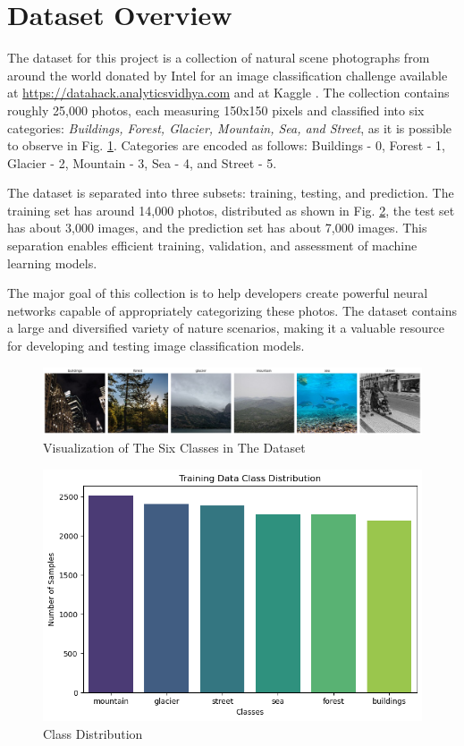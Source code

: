 \documentclass[conference]{IEEEtran}
\begin{document}
\section{Dataset Overview}
The dataset for this project is a collection of natural scene photographs from around the world donated by Intel for an image classification challenge available at \url{https://datahack.analyticsvidhya.com} and at Kaggle \cite{kaggleDataset}. The collection contains roughly 25,000 photos, each measuring 150x150 pixels and classified into six categories: \textit{Buildings, Forest, Glacier, Mountain, Sea, and Street}, as it is possible to observe in Fig. \ref{fig:visualizationClassesData}. Categories are encoded as follows: Buildings - 0, Forest - 1, Glacier - 2, Mountain - 3, Sea - 4, and Street - 5.

The dataset is separated into three subsets: training, testing, and prediction. The training set has around 14,000 photos, distributed as shown in Fig. \ref{fig:classDis}, the test set has about 3,000 images, and the prediction set has about 7,000 images. This separation enables efficient training, validation, and assessment of machine learning models.

The major goal of this collection is to help developers create powerful neural networks capable of appropriately categorizing these photos. The dataset contains a large and diversified variety of nature scenarios, making it a valuable resource for developing and testing image classification models.

\begin{figure}
    \centering
    \includegraphics[width=\linewidth]{img/classesVisualisation.png}
    \caption{Visualization of The Six Classes in The Dataset }
    \label{fig:visualizationClassesData}
\end{figure}

\begin{figure}
    \centering
    \includegraphics[width=\linewidth]{img/classDistribution.png}
    \caption{Class Distribution}
    \label{fig:classDis}
\end{figure}
\end{document}
